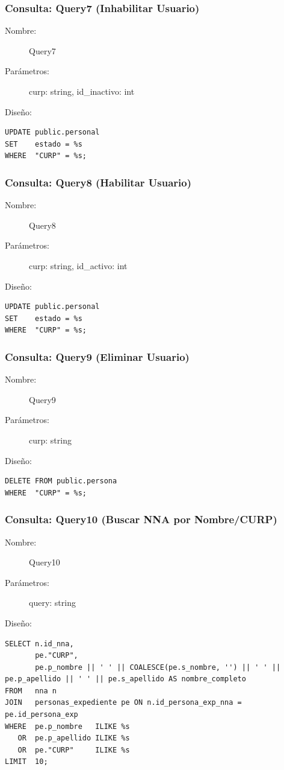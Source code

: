 \subsubsection{Consulta: Query7 (Inhabilitar Usuario)}
\begin{description}
    \item[Nombre:] Query7
    \item[Parámetros:] curp: string, id\_inactivo: int
    \item[Diseño:] \cdtEmpty
\end{description}
\begin{verbatim}
UPDATE public.personal 
SET    estado = %s 
WHERE  "CURP" = %s;
\end{verbatim}

\subsubsection{Consulta: Query8 (Habilitar Usuario)}
\begin{description}
    \item[Nombre:] Query8
    \item[Parámetros:] curp: string, id\_activo: int
    \item[Diseño:] \cdtEmpty
\end{description}
\begin{verbatim}
UPDATE public.personal 
SET    estado = %s 
WHERE  "CURP" = %s;
\end{verbatim}

\subsubsection{Consulta: Query9 (Eliminar Usuario)}
\begin{description}
    \item[Nombre:] Query9
    \item[Parámetros:] curp: string
    \item[Diseño:] \cdtEmpty
\end{description}
\begin{verbatim}
DELETE FROM public.persona 
WHERE  "CURP" = %s;
\end{verbatim}

\subsubsection{Consulta: Query10 (Buscar NNA por Nombre/CURP)}
\begin{description}
    \item[Nombre:] Query10
    \item[Parámetros:] query: string
    \item[Diseño:] \cdtEmpty
\end{description}
\begin{verbatim}
SELECT n.id_nna, 
       pe."CURP", 
       pe.p_nombre || ' ' || COALESCE(pe.s_nombre, '') || ' ' || pe.p_apellido || ' ' || pe.s_apellido AS nombre_completo
FROM   nna n
JOIN   personas_expediente pe ON n.id_persona_exp_nna = pe.id_persona_exp
WHERE  pe.p_nombre   ILIKE %s 
   OR  pe.p_apellido ILIKE %s
   OR  pe."CURP"     ILIKE %s
LIMIT  10;
\end{verbatim}

